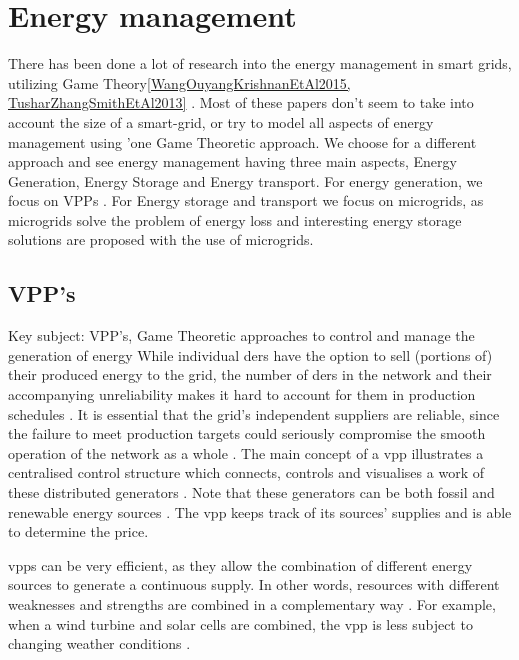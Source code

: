 \section{Energy management}\label{Energy-Management}
There has been done a lot of research into the energy management in smart grids, utilizing Game Theory\ref{WangOuyangKrishnanEtAl2015, TusharZhangSmithEtAl2013} . Most of these papers don't seem to take into account the size of a smart-grid, or try to model all aspects of energy management using 'one Game Theoretic approach.
We choose for a different approach and see energy management having three main aspects, Energy Generation, Energy Storage and Energy transport. For energy generation, we focus on \ac{VPP}s . For Energy storage and transport we focus on microgrids, as microgrids solve the problem of energy loss and interesting energy storage solutions are proposed with the use of microgrids.

\subsection{VPP's}
Key subject: VPP's, Game Theoretic approaches to control and manage the generation of energy
While individual \acp{der} have the option to sell (portions of) their produced energy to the grid, the number of \acp{der} in the network and their accompanying unreliability makes it hard to account for them in production schedules \cite{RobuKotaChalkiadakisEtAl2012}. It is essential that the grid's independent suppliers are reliable, since the failure to meet production targets could seriously compromise the smooth operation of the network as a whole \cite{ChalkiadakisRobuKotaEtAl2011}. The main concept of a \ac{vpp} illustrates a centralised control structure which connects, controls and visualises a work of these distributed generators \cite{NikonowiczMilewski2012}. Note that these generators can be both fossil and renewable energy sources \cite{LombardiPowalkoRudion2009}. The \ac{vpp} keeps track of its sources' supplies and is able to determine the price. 

\acp{vpp} can be very efficient, as they allow the combination of different energy sources to generate a continuous supply. In other words, resources with different weaknesses and strengths are combined in a complementary way \cite{Koeppel2003}. For example, when a wind turbine and solar cells are combined, the \ac{vpp} is less subject to changing weather conditions \cite{Tromly2001, Kumagai2012, MashhourMoghaddas-Tafreshi2011, NikonowiczMilewski2012}. 


